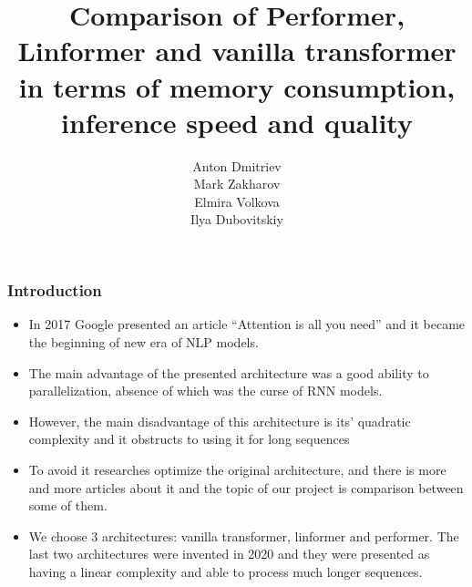 \documentclass[9pt]{beamer}%
\title{Comparison of Performer, Linformer and vanilla transformer in terms of memory consumption, inference speed and quality}
\author{Anton Dmitriev \\
      	Mark Zakharov \\
        Elmira Volkova \\
    	Ilya Dubovitskiy}
\begin{document}

\begin{frame}%
\titlepage
\end{frame}

\begin{frame}%
\frametitle{Introduction}

\begin{itemize}
	\item In 2017 Google presented an article “Attention is all you need” and it became the beginning of new era of NLP models.
	\item The main advantage of the presented architecture was a good ability to parallelization, absence of which was the curse of RNN models.
	\item However, the main disadvantage of this architecture is its' quadratic complexity and it obstructs to using it for long sequences 
	\item To avoid it researches optimize the original architecture, and there is more and more articles about it and the topic of our project is comparison between some of them. 
	\item We choose 3 architectures: vanilla transformer, linformer and performer. The last two architectures were invented in 2020 and they were presented as having a linear complexity and able to process much longer sequences.
\end{itemize}
\end{frame}
\end{document}
